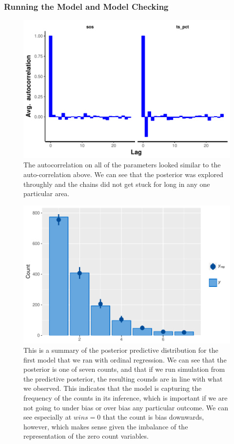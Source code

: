 \documentclass[10pt,a4paper, hidelinks]{article} %
\begin{document}
%

\subsubsection{Running the Model and Model Checking}
\begin{figure}[H]
	\centering
	\includegraphics[width=.6\linewidth]{../fig/polr_autocorr}
	\caption{The autocorrelation on all of the parameters looked similar to the auto-correlation above. We can see that the posterior was explored throughly and the chains did not get stuck for long in any one particular area. }
	\label{fig:polr_autocorrelation}
\end{figure}


\begin{figure}[H]
	\centering
	\includegraphics[width=0.7\linewidth]{../fig/polr_nonames_pp}
	\caption{This is a summary of the posterior predictive distribution for the first model that we ran with ordinal regression. We can see that the posterior is one of seven counts, and that if we run simulation from the predictive posterior, the resulting counds are in line with what we observed. This indicates that the model is capturing the frequency of the counts in its inference, which is important if we are not going to under bias or over bias any particular outcome. We can see especially at $wins = 0$ that the count is bias downwards, however, which makes sense given the imbalance of the representation of the zero count variables.}
	\label{fig:polrnonamespp}
\end{figure}
\end{document}
